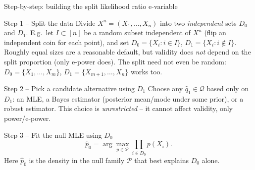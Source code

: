 \documentclass[aspectratio=169,10pt]{beamer}
\newcommand{\calP}{\mathcal{P}}
\newcommand{\calQ}{\mathcal{Q}}
\begin{document}
\begin{frame}{Step-by-step: building the split likelihood ratio e-variable}

  \begin{block}{Step 1 -- Split the data}
    Divide $X^n=(X_1,\ldots,X_n)$ into two \emph{independent} sets
    $D_0$ and $D_1$. E.g.\ let $I \subset [n]$ be a random subset
    independent of $X^n$ (flip an independent coin for each point), and
    set $D_0 = \{X_i : i \in I\}$, $D_1 = \{X_i : i \notin I\}$. Roughly
    equal sizes are a reasonable default, but validity does \emph{not}
    depend on the split proportion (only e-power does). The split need
    not even be random: $D_0=\{X_1,\ldots,X_m\}$, $D_1 = \{X_{m+1},\ldots,X_n\}$
    works too.
  \end{block}

  \begin{block}{Step 2 -- Pick a candidate alternative using $D_1$}
    Choose any $\hat q_1 \in \calQ$ based only on $D_1$: an MLE, a
    Bayes estimator (posterior mean/mode under some prior), or a robust
    estimator. This choice is \emph{unrestricted} -- it cannot affect
    validity, only power/e-power.
  \end{block}

  \begin{block}{Step 3 -- Fit the null MLE using $D_0$}
    $$ \hat p_0 = \arg\max_{p \in \calP} \prod_{i \in D_0} p(X_i). $$
    Here $\hat p_0$ is the density in the null family $\calP$ that best
    explains $D_0$ alone.
  \end{block}

\end{frame}
\end{document}

